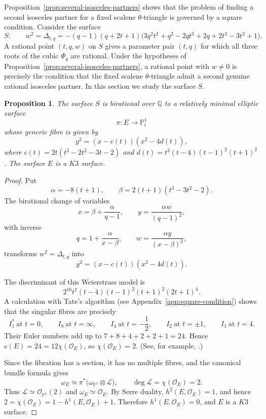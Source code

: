 \documentclass[11pt]{amsart}
\theoremstyle{plain}
\newtheorem{prop}[thm]{Proposition}
\theoremstyle{remark}
\theoremstyle{plain}
\newcommand{\Q}{\mathbb{Q}}
\begin{document}
Proposition~\ref{prop:several-isosceles-partners} shows that the problem of finding a second isosceles partner for a fixed scalene $\theta$-triangle is governed by a square condition. Consider the surface
\[
S:\qquad w^2=\Delta_{t,q}=-(q-1)(q+2t+1)
\bigl(
3q^2t^2+q^2-2qt^3+2q+2t^3-3t^2+1
\bigr).
\]
A rational point $(t,q,w)$ on $S$ gives a parameter pair $(t,q)$ for which all three roots of the cubic $\Phi_q$ are rational. Under the hypotheses of Proposition~\ref{prop:several-isosceles-partners}, a rational point with $w\ne0$ is precisely the condition that the fixed scalene $\theta$-triangle admit a second genuine rational isosceles partner.
In this section we study the surface $S$.
\begin{prop}\label{prop:square-surface-k3}
The surface $S$ is birational over $\Q$ to a relatively minimal elliptic
surface
\[
\pi:E\longrightarrow\mathbb P^1_t
\]
whose generic fibre is given by
\[
y^2=(x-c(t))(x^2-4d(t)),
\]
where $c(t)=2t(t^3-2t^2-3t-2)$ and
$d(t)=t^3(t-4)(t-1)^2(t+1)^2$. The surface $E$ is a $K3$ surface.
\end{prop}

\begin{proof}
Put
\[
\alpha=-8(t+1),\qquad
\beta=2(t+1)(t^3-3t^2-2).
\]
The birational change of variables
\[
x=\beta+\frac{\alpha}{q-1},
\qquad
y=\frac{\alpha w}{(q-1)^2},
\]
with inverse
\[
q=1+\frac{\alpha}{x-\beta},
\qquad
w=\frac{\alpha y}{(x-\beta)^2},
\]
transforms $w^2=\Delta_{t,q}$ into
\[
y^2=(x-c(t))(x^2-4d(t)).
\]

The discriminant of this Weierstrass model is
\[
2^{16}t^7(t-4)(t-1)^2(t+1)^2(2t+1)^4.
\]
A calculation with Tate's algorithm
(see Appendix~\ref{app:square-condition}) shows that the singular fibres
are precisely
\[
I_1^*\ \text{at }t=0,\qquad
I_8\ \text{at }t=\infty,\qquad
I_4\ \text{at }t=-\frac12,\qquad
I_2\ \text{at }t=\pm1,\qquad
I_1\ \text{at }t=4.
\]
Their Euler numbers add up to $7+8+4+2+2+1=24$. Hence
$e(E)=24=12\chi(\mathcal O_E)$, so $\chi(\mathcal O_E)=2$. (See, for
example, \cite[Sections~6.6--6.7]{SchuttShioda}.)

Since the fibration has a section, it has no multiple fibres, and the
canonical bundle formula gives
\[
\omega_E\simeq
\pi^*\bigl(\omega_{\mathbb P^1}\otimes\mathcal L\bigr),
\qquad
\deg\mathcal L=\chi(\mathcal O_E)=2.
\]
Thus $\mathcal L\simeq\mathcal O_{\mathbb P^1}(2)$ and
$\omega_E\simeq\mathcal O_E$. By Serre duality,
$h^2(E,\mathcal O_E)=1$, and hence
$2=\chi(\mathcal O_E)=1-h^1(E,\mathcal O_E)+1$. Therefore
$h^1(E,\mathcal O_E)=0$, and $E$ is a $K3$ surface.
\end{proof}
\end{document}

